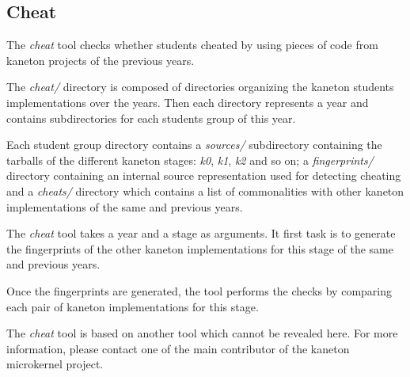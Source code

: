 %
%
%
%
%
%

%
%

\subsection{Cheat}
\label{section:cheat}

The \textit{cheat} tool checks whether students cheated by using pieces of
code from kaneton projects of the previous years.

The \textit{cheat/} directory is composed of directories organizing the
kaneton students implementations over the years. Then each directory
represents a year and contains subdirectories for each students group
of this year.

Each student group directory contains a \textit{sources/} subdirectory
containing the tarballs of the different kaneton stages: \textit{k0},
\textit{k1}, \textit{k2} and so on; a \textit{fingerprints/} directory
containing an internal source representation used for detecting cheating
and a \textit{cheats/} directory which contains a list of commonalities
with other kaneton implementations of the same and previous years.

The \textit{cheat} tool takes a year and a stage as arguments. It first
task is to generate the fingerprints of the other kaneton implementations
for this stage of the same and previous years.

Once the fingerprints are generated, the tool performs the checks by
comparing each pair of kaneton implementations for this stage.

The \textit{cheat} tool is based on another tool which cannot be revealed
here. For more information, please contact one of the main contributor of
the kaneton microkernel project.
